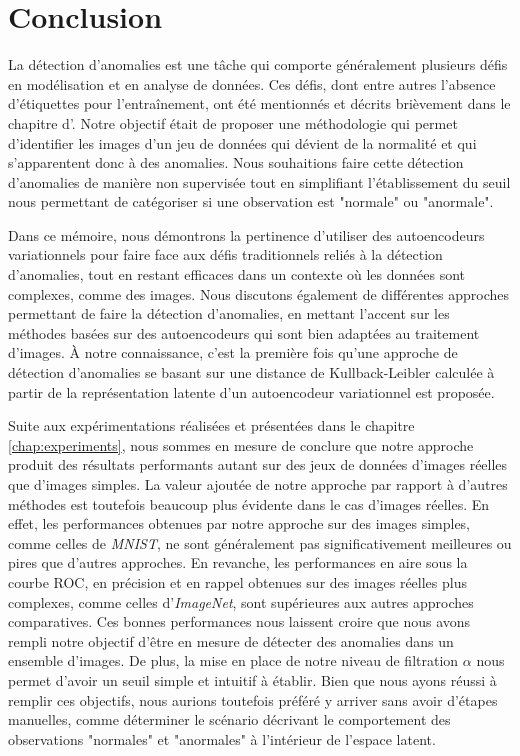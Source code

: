 \chapter*{Conclusion}           %
\label{chap:conclusion}         %

La détection d'anomalies est une tâche qui comporte généralement plusieurs défis en modélisation et en analyse de données. Ces défis, dont entre autres l'absence d'étiquettes pour l'entraînement, ont été mentionnés et décrits brièvement dans le chapitre d'. Notre objectif était de proposer une méthodologie qui permet d'identifier les images d'un jeu de données qui dévient de la normalité et qui s'apparentent donc à des anomalies. Nous souhaitions faire cette détection d'anomalies de manière non supervisée tout en simplifiant l'établissement du seuil nous permettant de catégoriser si une observation est "normale" ou  "anormale". 

Dans ce mémoire, nous démontrons la pertinence d'utiliser des autoencodeurs variationnels pour faire face aux défis traditionnels reliés à la détection d'anomalies, tout en restant efficaces dans un contexte où les données sont complexes, comme des images. Nous discutons également de différentes approches permettant de faire la détection d'anomalies, en mettant l'accent sur les méthodes basées sur des autoencodeurs qui sont bien adaptées au traitement d'images. À notre connaissance, c'est la première fois qu'une approche de détection d'anomalies se basant sur une distance de Kullback-Leibler calculée à partir de la représentation latente d'un autoencodeur variationnel est proposée.

Suite aux expérimentations réalisées et présentées dans le chapitre \ref{chap:experiments}, nous sommes en mesure de conclure que notre approche produit des résultats performants autant sur des jeux de données d'images réelles que d'images simples. La valeur ajoutée de notre approche par rapport à d'autres méthodes est toutefois beaucoup plus évidente dans le cas d'images réelles. En effet, les performances obtenues par notre approche sur des images simples, comme celles de \textit{MNIST}, ne sont généralement pas significativement meilleures ou pires que d'autres approches. En revanche, les performances en aire sous la courbe ROC, en précision et en rappel obtenues sur des images réelles plus complexes, comme celles d'\textit{ImageNet}, sont supérieures aux autres approches comparatives. Ces bonnes performances nous laissent croire que nous avons rempli notre objectif d'être en mesure de détecter des anomalies dans un ensemble d'images. De plus, la mise en place de notre niveau de filtration $\alpha$ nous permet d'avoir un seuil simple et intuitif à établir. Bien que nous ayons réussi à remplir ces objectifs, nous aurions toutefois préféré y arriver sans avoir d'étapes manuelles, comme déterminer le scénario décrivant le comportement des observations "normales" et "anormales" à l'intérieur de l'espace latent.


